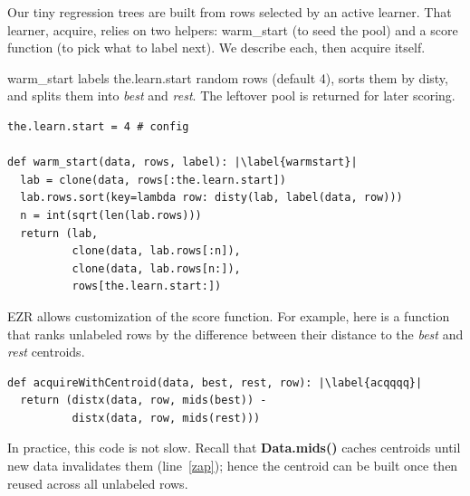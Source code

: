 \documentclass[AMA,STIX2COL]{WileyNJDv5}
\newcommand{\cls}[1]{%
  \setlength{\fboxsep}{1.5pt}%
  \colorbox{clsbg}{\sffamily\bfseries{#1}}%
}
\begin{document}
Our tiny regression trees are built from rows selected by an active 
learner. That learner, \textsf{acquire}, relies on two helpers: 
\textsf{warm\_start} (to seed the pool) and a \textsf{score} function 
(to pick what to label next). We describe each, then \textsf{acquire} 
itself.

\textsf{warm\_start} labels \textsf{the.learn.start} random rows
(default 4), sorts them by \textsf{disty}, and splits them into
\textit{best} and \textit{rest}. The leftover pool is returned for
later scoring.
\begin{lstlisting}
the.learn.start = 4 # config

def warm_start(data, rows, label): |\label{warmstart}|
  lab = clone(data, rows[:the.learn.start])
  lab.rows.sort(key=lambda row: disty(lab, label(data, row)))
  n = int(sqrt(len(lab.rows)))
  return (lab,
          clone(data, lab.rows[:n]),
          clone(data, lab.rows[n:]),
          rows[the.learn.start:])
\end{lstlisting}
EZR allows  customization of the 
\textsf{score} function. For example,
here is a function that ranks unlabeled rows by the difference between their 
distance to the \textit{best} and \textit{rest} centroids. 
\begin{lstlisting}
def acquireWithCentroid(data, best, rest, row): |\label{acqqqq}|
  return (distx(data, row, mids(best)) -
          distx(data, row, mids(rest)))
\end{lstlisting}
In practice, this code is not slow. Recall that 
\cls{Data.mids()} caches centroids until new data invalidates them 
(line~\ref{zap}); hence the centroid
can be  built once  then reused across all unlabeled rows.
\end{document}
